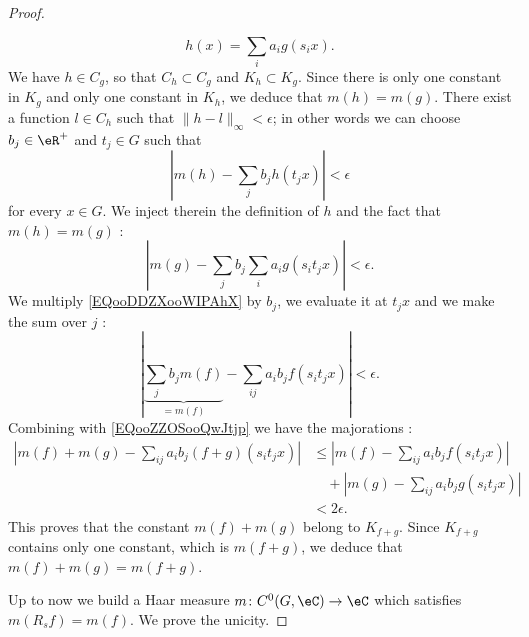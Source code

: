 \begin{proof}
\begin{subproof}
\begin{equation}
                h(x)=\sum_ia_ig(s_ix).
            \end{equation}
            We have \( h\in C_g\), so that \( C_h\subset C_g\) and \( K_h\subset K_g\). Since there is only one constant in \( K_g\) and only one constant in \( K_h\), we deduce that \( m(h)=m(g)\). There exist a function \( l\in C_h\) such that \( \| h-l \|_{\infty}<\epsilon\); in other words we can choose \( b_j\in \eR^+\) and \( t_j\in G\) such that
            \begin{equation}
                | m(h)-\sum_{j}b_jh(t_jx) |<\epsilon
            \end{equation}
            for every \( x\in G\). We inject therein the definition of \( h\) and the fact that \( m(h)=m(g)\) :
            \begin{equation}        \label{EQooZZOSooQwJtjp}
                | m(g)-\sum_jb_j\sum_ia_ig(s_it_jx) |<\epsilon.
            \end{equation}
            We multiply \eqref{EQooDDZXooWIPAhX} by \( b_j\), we evaluate it at \(t_jx\) and we make the sum over \( j\) :
            \begin{equation}
                | \underbrace{\sum_jb_jm(f)}_{=m(f)}-\sum_{ij}a_ib_jf(s_it_jx) |<\epsilon.
            \end{equation}
            Combining with \eqref{EQooZZOSooQwJtjp} we have the majorations :
            \begin{subequations}
                \begin{align}
                    | m(f)+m(g)-\sum_{ij}a_ib_j(f+g)(s_it_jx) |&\leq | m(f)-\sum_{ij}a_ib_jf(s_it_jx) |\\
                                                                &\quad+| m(g)-\sum_{ij}a_ib_jg(s_it_jx) |   \nonumber\\
                    &<2\epsilon.
                \end{align}
            \end{subequations}
            This proves that the constant \( m(f)+m(g)\) belong to \( K_{f+g}\). Since \( K_{f+g}\) contains only one constant, which is \( m(f+g)\), we deduce that \( m(f)+m(g)=m(f+g)\).
    \end{subproof}
    Up to now we build a Haar measure \( m\colon C^0(G,\eC)\to \eC\) which satisfies \( m(R_sf)=m(f)\). We prove the unicity. 


\end{proof}
